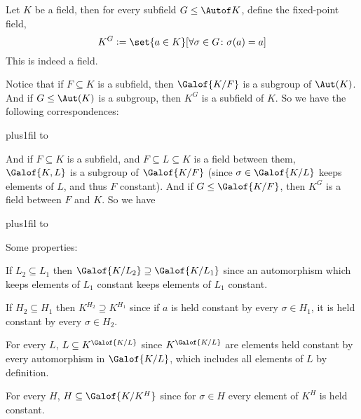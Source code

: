 \bdefn

    Let $K$ be a field, then for every subfield $G\leq\Autof K$, define the {\emphcolor fixed-point field},
    $$ K^G \coloneqq \set{a\in K}[\forall\sigma\in G\colon \sigma(a)=a] $$
    This is indeed a field.

\edefn

Notice that if $F\subseteq K$ is a subfield, then $\Galof{K/F}$ is a subgroup of $\Aut(K)$.
And if $G\leq\Aut(K)$ is a subgroup, then $K^G$ is a subfield of $K$.
So we have the following correspondences:

\medskip
{\tabskip=0pt plus1fil
\offinterlineskip\halign to}
\medskip

And if $F\subseteq K$ is a subfield, and $F\subseteq L\subseteq K$ is a field between them, $\Galof{K,L}$ is a subgroup of $\Galof{K/F}$ (since $\sigma\in\Galof{K/L}$ keeps elements of $L$, and thus $F$
constant).
And if $G\leq\Galof{K/F}$, then $K^G$ is a field between $F$ and $K$.
So we have

\medskip
{\tabskip=0pt plus1fil
\offinterlineskip\halign to}
\medskip

Some properties:
\benum
    \item If $L_2\subseteq L_1$ then $\Galof{K/L_2}\supseteq\Galof{K/L_1}$ since an automorphism which keeps elements of $L_1$ constant keeps elements of $L_1$ constant.
    \item If $H_2\subseteq H_1$ then $K^{H_2}\supseteq K^{H_1}$ since if $a$ is held constant by every $\sigma\in H_1$, it is held constant by every $\sigma\in H_2$.
    \item For every $L$, $L\subseteq K^{\Galof{K/L}}$ since $K^{\Galof{K/L}}$ are elements held constant by every automorphism in $\Galof{K/L}$, which includes all elements of $L$ by definition.
    \item For every $H$, $H\subseteq\Galof{K/K^H}$ since for $\sigma\in H$ every element of $K^H$ is held constant.
\eenum

